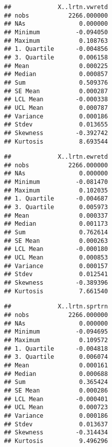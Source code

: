 \documentclass[
]{article}
\newenvironment{Shaded}{\begin{snugshade}}{\end{snugshade}}
\newcommand{\FunctionTok}[1]{\textcolor[rgb]{0.13,0.29,0.53}{\textbf{#1}}}
\newcommand{\NormalTok}[1]{#1}
\newcommand{\SpecialCharTok}[1]{\textcolor[rgb]{0.81,0.36,0.00}{\textbf{#1}}}
\begin{document}
\begin{Shaded}
\end{Shaded}

\begin{verbatim}
##             X..lrtn.vwretd
## nobs           2266.000000
## NAs               0.000000
## Minimum          -0.094050
## Maximum           0.108763
## 1. Quartile      -0.004856
## 3. Quartile       0.006158
## Mean              0.000225
## Median            0.000857
## Sum               0.509376
## SE Mean           0.000287
## LCL Mean         -0.000338
## UCL Mean          0.000787
## Variance          0.000186
## Stdev             0.013655
## Skewness         -0.392742
## Kurtosis          8.693544
\end{verbatim}

\begin{Shaded}
\end{Shaded}

\begin{verbatim}
##             X..lrtn.ewretd
## nobs           2266.000000
## NAs               0.000000
## Minimum          -0.081470
## Maximum           0.102035
## 1. Quartile      -0.004687
## 3. Quartile       0.005973
## Mean              0.000337
## Median            0.001173
## Sum               0.762614
## SE Mean           0.000263
## LCL Mean         -0.000180
## UCL Mean          0.000853
## Variance          0.000157
## Stdev             0.012541
## Skewness         -0.389396
## Kurtosis          7.661540
\end{verbatim}

\begin{Shaded}
\end{Shaded}

\begin{verbatim}
##             X..lrtn.sprtrn
## nobs           2266.000000
## NAs               0.000000
## Minimum          -0.094695
## Maximum           0.109572
## 1. Quartile      -0.004818
## 3. Quartile       0.006074
## Mean              0.000161
## Median            0.000688
## Sum               0.365424
## SE Mean           0.000286
## LCL Mean         -0.000401
## UCL Mean          0.000723
## Variance          0.000186
## Stdev             0.013637
## Skewness         -0.314434
## Kurtosis          9.496296
\end{verbatim}
\end{document}
